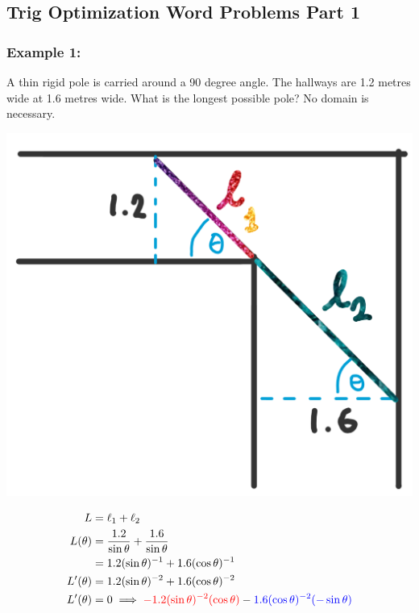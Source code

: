 \documentclass{article}
\begin{document}
\subsection{Trig Optimization Word Problems Part 1}
\subsubsection*{Example 1:}
A thin rigid pole is carried around a 90 degree angle. The hallways are 1.2 metres wide at 1.6 metres wide. What is the longest possible pole? No domain is necessary.


\begin{minipage}{0.5\textwidth}
  \centering
  \includegraphics[width=\textwidth]{imgs/op1.png}
\end{minipage}%
\begin{minipage}{0.5\textwidth}
\begin{align*}
    L &= \ell_1 + \ell_2 \\
    L(\theta) &= \frac{1.2}{\sin \theta} + \frac{1.6}{\sin \theta} \\
              &= 1.2(\sin \theta)^{-1} + 1.6(\cos \theta)^{-1} \\
    L'(\theta) &= 1.2(\sin \theta)^{-2} + 1.6(\cos \theta)^{-2} \\
    L'(\theta) &= 0 \implies \textcolor{red}{-1.2(\sin \theta)^{-2}(\cos \theta)} - \textcolor{blue}{1.6(\cos \theta)^{-2}(-\sin \theta)} \\
\end{align*}
\end{minipage}
\end{document}
